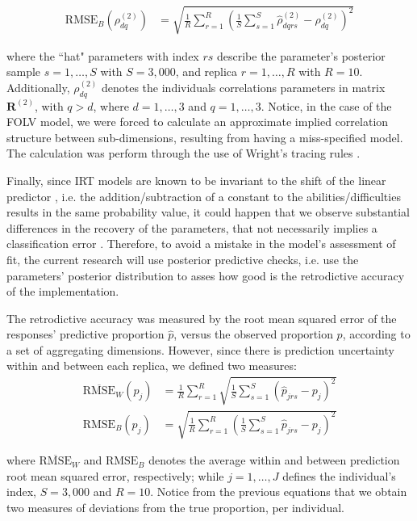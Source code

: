 %
\begin{align}
	\text{RMSE}_{B} \left( \rho^{(2)}_{dq} \right) &=\sqrt{\frac{1}{R} \sum_{r=1}^{R} \left( \frac{1}{S} \sum_{s=1}^{S} \hat{\rho}^{(2)}_{dqrs} - \rho^{(2)}_{dq} \right)^2}
\end{align}

\noindent where the ``hat" parameters with index $rs$ describe the parameter's posterior sample $s=1, \dots, S$ with $S=3,000$, and replica $r=1, \dots, R$ with $R=10$. Additionally, $\rho^{(2)}_{dq}$ denotes the individuals correlations parameters in matrix $\boldsymbol{R}^{(2)}$, with $q>d$, where $d=1,\dots,3$ and $q=1,\dots,3$. Notice, in the case of the FOLV model, we were forced to calculate an approximate implied correlation structure between sub-dimensions, resulting from having a miss-specified model. The calculation was perform through the use of Wright's tracing rules \cite{Beaujean_2014}.

Finally, since IRT models are known to be invariant to the shift of the linear predictor \cite{Baker_et_al_1992, Bock_1972}, i.e. the addition/subtraction of a constant to the abilities/difficulties results in the same probability value, it could happen that we observe substantial differences in the recovery of the parameters, that not necessarily implies a classification error  \cite{Wollack_2002}. Therefore, to avoid a mistake in the model's assessment of fit, the current research will use posterior predictive checks, i.e. use the parameters' posterior distribution to asses how good is the retrodictive accuracy of the implementation.

The retrodictive accuracy was measured by the root mean squared error of the responses' predictive proportion $\hat{p}$, versus the observed proportion $p$, according to a set of aggregating dimensions. However, since there is prediction uncertainty within and between each replica, we defined two measures:
%
\begin{align}
	\overline{\text{RMSE}}_{W} \left( p_{j} \right) &= \frac{1}{R} \sum_{r=1}^{R} \sqrt{ \frac{1}{S} \sum_{s=1}^{S} \left( \hat{p}_{jrs} - p_{j} \right)^2} \\
	\text{RMSE}_{B} \left( p_{j} \right) &= \sqrt{ \frac{1}{R} \sum_{r=1}^{R}  \left( \frac{1}{S} \sum_{s=1}^{S} \hat{p}_{jrs} - p_{j} \right)^2} 
\end{align}

\noindent where $\overline{\text{RMSE}}_{W}$ and $\text{RMSE}_{B}$ denotes the average within and between prediction root mean squared error, respectively; while $j=1,\dots,J$ defines the individual's index, $S=3,000$ and $R=10$. Notice from the previous equations that we obtain two measures of deviations from the true proportion, per individual.

